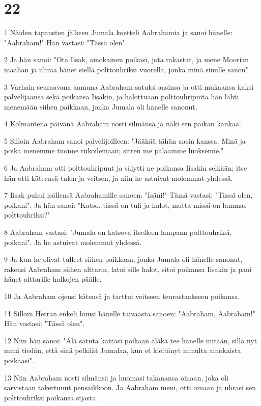 \chapter{22}

\par 1 Näiden tapausten jälkeen Jumala koetteli Aabrahamia ja sanoi hänelle: "Aabraham!" Hän vastasi: "Tässä olen".
\par 2 Ja hän sanoi: "Ota Iisak, ainokainen poikasi, jota rakastat, ja mene Moorian maahan ja uhraa hänet siellä polttouhriksi vuorella, jonka minä sinulle sanon".
\par 3 Varhain seuraavana aamuna Aabraham satuloi aasinsa ja otti mukaansa kaksi palvelijaansa sekä poikansa Iisakin, ja halottuaan polttouhripuita hän lähti menemään siihen paikkaan, jonka Jumala oli hänelle sanonut.
\par 4 Kolmantena päivänä Aabraham nosti silmänsä ja näki sen paikan kaukaa.
\par 5 Silloin Aabraham sanoi palvelijoilleen: "Jääkää tähän aasin kanssa. Minä ja poika menemme tuonne rukoilemaan; sitten me palaamme luoksenne."
\par 6 Ja Aabraham otti polttouhripuut ja sälytti ne poikansa Iisakin selkään; itse hän otti käteensä tulen ja veitsen, ja niin he astuivat molemmat yhdessä.
\par 7 Iisak puhui isällensä Aabrahamille sanoen: "Isäni!" Tämä vastasi: "Tässä olen, poikani". Ja hän sanoi: "Katso, tässä on tuli ja halot, mutta missä on lammas polttouhriksi?"
\par 8 Aabraham vastasi: "Jumala on katsova itselleen lampaan polttouhriksi, poikani". Ja he astuivat molemmat yhdessä.
\par 9 Ja kun he olivat tulleet siihen paikkaan, jonka Jumala oli hänelle sanonut, rakensi Aabraham siihen alttarin, latoi sille halot, sitoi poikansa Iisakin ja pani hänet alttarille halkojen päälle.
\par 10 Ja Aabraham ojensi kätensä ja tarttui veitseen teurastaakseen poikansa.
\par 11 Silloin Herran enkeli huusi hänelle taivaasta sanoen: "Aabraham, Aabraham!" Hän vastasi: "Tässä olen".
\par 12 Niin hän sanoi: "Älä satuta kättäsi poikaan äläkä tee hänelle mitään, sillä nyt minä tiedän, että sinä pelkäät Jumalaa, kun et kieltänyt minulta ainokaista poikaasi".
\par 13 Niin Aabraham nosti silmänsä ja huomasi takanansa oinaan, joka oli sarvistaan takertunut pensaikkoon. Ja Aabraham meni, otti oinaan ja uhrasi sen polttouhriksi poikansa sijasta.
